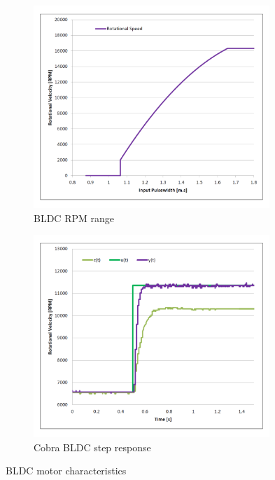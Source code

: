 \begin{figure}[hbtp]
\begin{subfigure}{0.5\textwidth}
\centering
\includegraphics[width=0.98\textwidth]{graphs/bldc-range}
\caption{BLDC RPM range}
\label{fig:bldc-range}
\end{subfigure}
\begin{subfigure}{0.5\textwidth}
\centering
\includegraphics[width=0.98\textwidth]{graphs/BLDC-step}
\caption{Cobra BLDC step response}
\label{fig:bldc-step}
\end{subfigure}
\caption{BLDC motor characteristics}
\end{figure}
